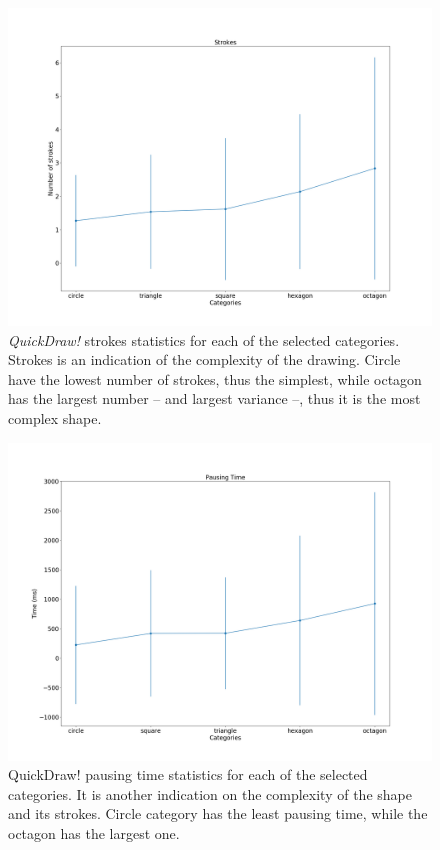 \begin{figure}
    \centering
    \includegraphics[scale=0.4]{images/dataset/quickdraw_strokes.png}
    \caption{\textit{QuickDraw!} strokes statistics for each of the selected categories. Strokes is an indication of the complexity of the drawing. Circle have the lowest number of strokes, thus the simplest, while octagon has the largest number -- and largest variance --, thus it is the most complex shape.}
    \label{fig:quickdraw_strokes}
\end{figure}

\begin{figure}
    \centering
    \includegraphics[scale=0.4]{images/dataset/quickdraw_pausing_time.png}
    \caption{QuickDraw! pausing time statistics for each of the selected categories. It is another indication on the complexity of the shape and its strokes. Circle category has the least pausing time, while the octagon has the largest one.}
    \label{fig:quickdraw_pausing_time}
\end{figure}

